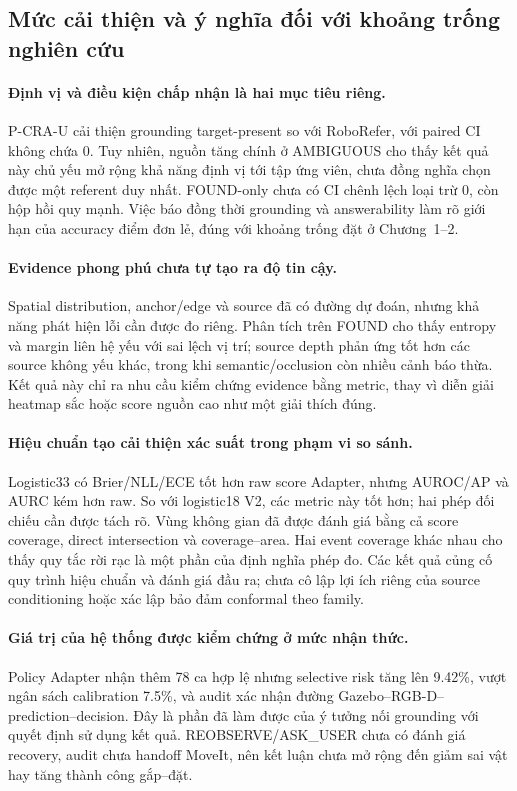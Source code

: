 \subsection{Mức cải thiện và ý nghĩa đối với khoảng trống nghiên cứu}

\paragraph{Định vị và điều kiện chấp nhận là hai mục tiêu riêng.}
P-CRA-U cải thiện grounding target-present so với RoboRefer, với paired
CI không chứa 0. Tuy nhiên, nguồn tăng chính ở AMBIGUOUS cho thấy kết quả
này chủ yếu mở rộng khả năng định vị tới tập ứng viên, chưa đồng nghĩa
chọn được một referent duy nhất. FOUND-only chưa có CI chênh lệch loại
trừ 0, còn hộp hồi quy mạnh. Việc báo đồng thời grounding và answerability
làm rõ giới hạn của accuracy điểm đơn lẻ, đúng với khoảng trống đặt ở
Chương~1--2.

\paragraph{Evidence phong phú chưa tự tạo ra độ tin cậy.}
Spatial distribution, anchor/edge và source đã có đường dự đoán, nhưng
khả năng phát hiện lỗi cần được đo riêng. Phân tích trên FOUND cho thấy
entropy và margin liên hệ yếu với sai lệch vị trí; source depth phản ứng
tốt hơn các source không yếu khác, trong khi semantic/occlusion còn nhiều
cảnh báo thừa. Kết quả này chỉ ra nhu cầu kiểm chứng evidence bằng metric,
thay vì diễn giải heatmap sắc hoặc score nguồn cao như một giải thích đúng.

\paragraph{Hiệu chuẩn tạo cải thiện xác suất trong phạm vi so sánh.}
Logistic33 có Brier/NLL/ECE tốt hơn raw score Adapter, nhưng AUROC/AP và AURC kém hơn raw. So với logistic18 V2, các metric này tốt hơn; hai phép đối chiếu cần được tách rõ. Vùng không gian đã được đánh giá bằng cả score coverage, direct
intersection và coverage--area. Hai event coverage khác nhau cho thấy
quy tắc rời rạc là một phần của định nghĩa phép đo. Các kết quả củng cố
quy trình hiệu chuẩn và đánh giá đầu ra; chưa cô lập lợi ích riêng của
source conditioning hoặc xác lập bảo đảm conformal theo family.

\paragraph{Giá trị của hệ thống được kiểm chứng ở mức nhận thức.}
Policy Adapter nhận thêm 78 ca hợp lệ nhưng selective risk tăng lên 9.42\%, vượt ngân sách calibration 7.5\%,
và audit xác nhận đường Gazebo--RGB-D--prediction--decision. Đây là phần
đã làm được của ý tưởng nối grounding với quyết định sử dụng kết quả.
REOBSERVE/ASK\_USER chưa có đánh giá recovery, audit chưa handoff MoveIt,
nên kết luận chưa mở rộng đến giảm sai vật hay tăng thành công gắp--đặt.

